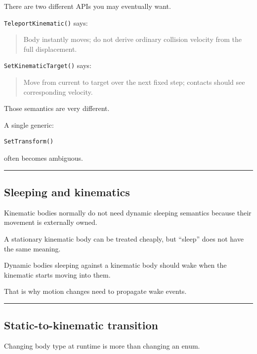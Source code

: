 There are two different APIs you may eventually want.

\texttt{TeleportKinematic()} says:

\begin{quote}
Body instantly moves; do not derive ordinary collision velocity from the full displacement.
\end{quote}

\texttt{SetKinematicTarget()} says:

\begin{quote}
Move from current to target over the next fixed step; contacts should see corresponding velocity.
\end{quote}

Those semantics are very different.

A single generic:

\begin{verbatim}
SetTransform()
\end{verbatim}

often becomes ambiguous.

\begin{center}\rule{0.5\linewidth}{0.5pt}\end{center}

\subsection{Sleeping and kinematics}\label{06-engine-ii-ch038-sleeping-and-kinematics}

Kinematic bodies normally do not need dynamic sleeping semantics because their movement is externally owned.

A stationary kinematic body can be treated cheaply, but ``sleep'' does not have the same meaning.

Dynamic bodies sleeping against a kinematic body should wake when the kinematic starts moving into them.

That is why motion changes need to propagate wake events.

\begin{center}\rule{0.5\linewidth}{0.5pt}\end{center}

\subsection{Static-to-kinematic transition}\label{06-engine-ii-ch038-static-to-kinematic-transition}

Changing body type at runtime is more than changing an enum.

